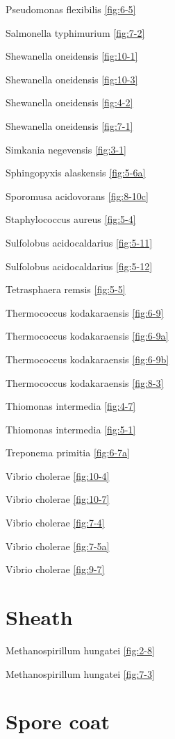 \documentclass[]{tufte-book}
\begin{document}
Pseudomonas flexibilis \ref{fig:6-5}

Salmonella typhimurium \ref{fig:7-2}

Shewanella oneidensis \ref{fig:10-1}

Shewanella oneidensis \ref{fig:10-3}

Shewanella oneidensis \ref{fig:4-2}

Shewanella oneidensis \ref{fig:7-1}

Simkania negevensis \ref{fig:3-1}

Sphingopyxis alaskensis \ref{fig:5-6a}

Sporomusa acidovorans \ref{fig:8-10c}

Staphylococcus aureus \ref{fig:5-4}

Sulfolobus acidocaldarius \ref{fig:5-11}

Sulfolobus acidocaldarius \ref{fig:5-12}

Tetrasphaera remsis \ref{fig:5-5}

Thermococcus kodakaraensis \ref{fig:6-9}

Thermococcus kodakaraensis \ref{fig:6-9a}

Thermococcus kodakaraensis \ref{fig:6-9b}

Thermococcus kodakaraensis \ref{fig:8-3}

Thiomonas intermedia \ref{fig:4-7}

Thiomonas intermedia \ref{fig:5-1}

Treponema primitia \ref{fig:6-7a}

Vibrio cholerae \ref{fig:10-4}

Vibrio cholerae \ref{fig:10-7}

Vibrio cholerae \ref{fig:7-4}

Vibrio cholerae \ref{fig:7-5a}

Vibrio cholerae \ref{fig:9-7}

\section*{Sheath}\label{sheath}

Methanospirillum hungatei \ref{fig:2-8}

Methanospirillum hungatei \ref{fig:7-3}

\section*{Spore coat}\label{spore-coat}
\end{document}
